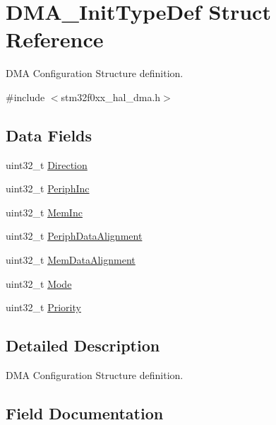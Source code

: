 \hypertarget{struct_d_m_a___init_type_def}{}\section{D\+M\+A\+\_\+\+Init\+Type\+Def Struct Reference}
\label{struct_d_m_a___init_type_def}


D\+MA Configuration Structure definition.  




{\ttfamily \#include $<$stm32f0xx\+\_\+hal\+\_\+dma.\+h$>$}

\subsection*{Data Fields}
\begin{DoxyCompactItemize}
\item 
uint32\+\_\+t \hyperlink{struct_d_m_a___init_type_def_ab94410c1333b512e271b1c135fe50916}{Direction}
\item 
uint32\+\_\+t \hyperlink{struct_d_m_a___init_type_def_a4925ca3ceb52340daddc92817dc304d9}{Periph\+Inc}
\item 
uint32\+\_\+t \hyperlink{struct_d_m_a___init_type_def_a831756fbcd64feb1e570a9bf743b5b8d}{Mem\+Inc}
\item 
uint32\+\_\+t \hyperlink{struct_d_m_a___init_type_def_aca5b89241171c093fd0fc6dacf72683c}{Periph\+Data\+Alignment}
\item 
uint32\+\_\+t \hyperlink{struct_d_m_a___init_type_def_afe3adac32f5411b1a744c030f398aa5e}{Mem\+Data\+Alignment}
\item 
uint32\+\_\+t \hyperlink{struct_d_m_a___init_type_def_a0ffc93ec511ed9cf1663f6939bd3e839}{Mode}
\item 
uint32\+\_\+t \hyperlink{struct_d_m_a___init_type_def_a72acf77c0b19359eb70764505ae4bd70}{Priority}
\end{DoxyCompactItemize}


\subsection{Detailed Description}
D\+MA Configuration Structure definition. 

\subsection{Field Documentation}
\mbox{\label{struct_d_m_a___init_type_def_ab94410c1333b512e271b1c135fe50916}} 
